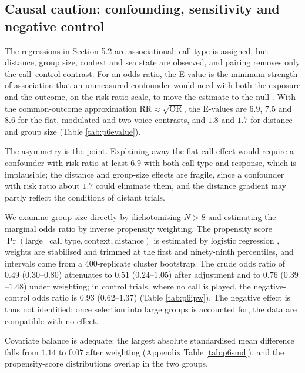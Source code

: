 \documentclass{apmcmthesis}
\begin{document}
\subsection{Causal caution: confounding, sensitivity and negative control}

The regressions in Section 5.2 are associational: call type is assigned, but distance, group size, context and sea state are observed, and pairing removes only the call--control contrast. For an odds ratio, the E-value is the minimum strength of association that an unmeasured confounder would need with both the exposure and the outcome, on the risk-ratio scale, to move the estimate to the null \cite{vanderweele2017}. With the common-outcome approximation $\mathrm{RR}\approx\sqrt{\mathrm{OR}}$, the E-values are $6.9$, $7.5$ and $8.6$ for the flat, modulated and two-voice contrasts, and $1.8$ and $1.7$ for distance and group size (Table \ref{tab:p6evalue}).



The asymmetry is the point. Explaining away the flat-call effect would require a confounder with risk ratio at least $6.9$ with both call type and response, which is implausible; the distance and group-size effects are fragile, since a confounder with risk ratio about $1.7$ could eliminate them, and the distance gradient may partly reflect the conditions of distant trials.

We examine group size directly by dichotomising $N>8$ and estimating the marginal odds ratio by inverse propensity weighting. The propensity score $\Pr(\text{large}\mid\text{call type},\text{context},\text{distance})$ is estimated by logistic regression \cite{rosenbaum1983}, weights are stabilised and trimmed at the first and ninety-ninth percentiles, and intervals come from a 400-replicate cluster bootstrap. The crude odds ratio of $0.49$ ($0.30$--$0.80$) attenuates to $0.51$ ($0.24$--$1.05$) after adjustment and to $0.76$ ($0.39$--$1.48$) under weighting; in control trials, where no call is played, the negative-control odds ratio is $0.93$ ($0.62$--$1.37$) (Table \ref{tab:p6ipw}). The negative effect is thus not identified: once selection into large groups is accounted for, the data are compatible with no effect.



Covariate balance is adequate: the largest absolute standardised mean difference falls from $1.14$ to $0.07$ after weighting (Appendix Table \ref{tab:p6smd}), and the propensity-score distributions overlap in the two groups.
\end{document}

